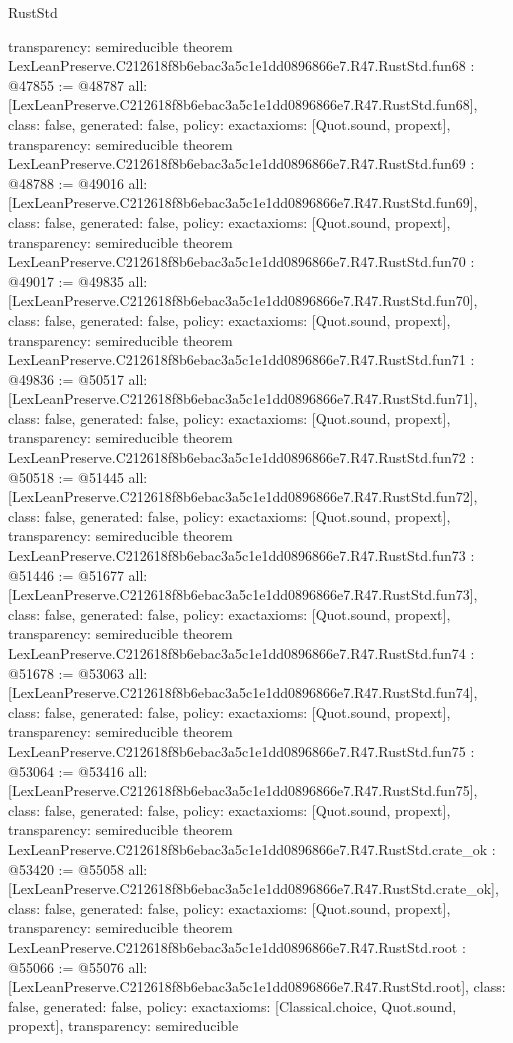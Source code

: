 \begin{lexlean}{RustStd}
\begin{coremodule}
{  transparency: semireducible
}
theorem LexLeanPreserve.C212618f8b6ebac3a5c1e1dd0896866e7.R47.RustStd.fun68 : @47855 := @48787 {
  all: [LexLeanPreserve.C212618f8b6ebac3a5c1e1dd0896866e7.R47.RustStd.fun68],
  class: false,
  generated: false,
  policy: exact{axioms: [Quot.sound, propext]},
  transparency: semireducible
}
theorem LexLeanPreserve.C212618f8b6ebac3a5c1e1dd0896866e7.R47.RustStd.fun69 : @48788 := @49016 {
  all: [LexLeanPreserve.C212618f8b6ebac3a5c1e1dd0896866e7.R47.RustStd.fun69],
  class: false,
  generated: false,
  policy: exact{axioms: [Quot.sound, propext]},
  transparency: semireducible
}
theorem LexLeanPreserve.C212618f8b6ebac3a5c1e1dd0896866e7.R47.RustStd.fun70 : @49017 := @49835 {
  all: [LexLeanPreserve.C212618f8b6ebac3a5c1e1dd0896866e7.R47.RustStd.fun70],
  class: false,
  generated: false,
  policy: exact{axioms: [Quot.sound, propext]},
  transparency: semireducible
}
theorem LexLeanPreserve.C212618f8b6ebac3a5c1e1dd0896866e7.R47.RustStd.fun71 : @49836 := @50517 {
  all: [LexLeanPreserve.C212618f8b6ebac3a5c1e1dd0896866e7.R47.RustStd.fun71],
  class: false,
  generated: false,
  policy: exact{axioms: [Quot.sound, propext]},
  transparency: semireducible
}
theorem LexLeanPreserve.C212618f8b6ebac3a5c1e1dd0896866e7.R47.RustStd.fun72 : @50518 := @51445 {
  all: [LexLeanPreserve.C212618f8b6ebac3a5c1e1dd0896866e7.R47.RustStd.fun72],
  class: false,
  generated: false,
  policy: exact{axioms: [Quot.sound, propext]},
  transparency: semireducible
}
theorem LexLeanPreserve.C212618f8b6ebac3a5c1e1dd0896866e7.R47.RustStd.fun73 : @51446 := @51677 {
  all: [LexLeanPreserve.C212618f8b6ebac3a5c1e1dd0896866e7.R47.RustStd.fun73],
  class: false,
  generated: false,
  policy: exact{axioms: [Quot.sound, propext]},
  transparency: semireducible
}
theorem LexLeanPreserve.C212618f8b6ebac3a5c1e1dd0896866e7.R47.RustStd.fun74 : @51678 := @53063 {
  all: [LexLeanPreserve.C212618f8b6ebac3a5c1e1dd0896866e7.R47.RustStd.fun74],
  class: false,
  generated: false,
  policy: exact{axioms: [Quot.sound, propext]},
  transparency: semireducible
}
theorem LexLeanPreserve.C212618f8b6ebac3a5c1e1dd0896866e7.R47.RustStd.fun75 : @53064 := @53416 {
  all: [LexLeanPreserve.C212618f8b6ebac3a5c1e1dd0896866e7.R47.RustStd.fun75],
  class: false,
  generated: false,
  policy: exact{axioms: [Quot.sound, propext]},
  transparency: semireducible
}
theorem LexLeanPreserve.C212618f8b6ebac3a5c1e1dd0896866e7.R47.RustStd.crate_ok : @53420 := @55058 {
  all: [LexLeanPreserve.C212618f8b6ebac3a5c1e1dd0896866e7.R47.RustStd.crate_ok],
  class: false,
  generated: false,
  policy: exact{axioms: [Quot.sound, propext]},
  transparency: semireducible
}
theorem LexLeanPreserve.C212618f8b6ebac3a5c1e1dd0896866e7.R47.RustStd.root : @55066 := @55076 {
  all: [LexLeanPreserve.C212618f8b6ebac3a5c1e1dd0896866e7.R47.RustStd.root],
  class: false,
  generated: false,
  policy: exact{axioms: [Classical.choice, Quot.sound, propext]},
  transparency: semireducible
}


\end{coremodule}
\end{lexlean}
